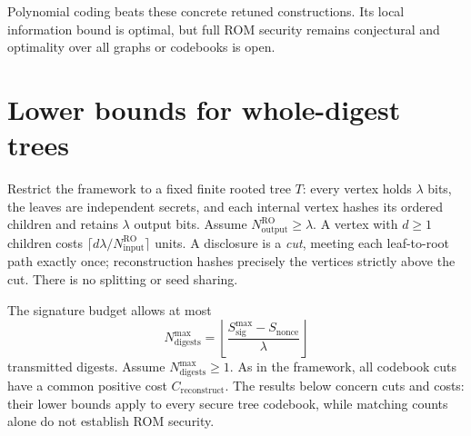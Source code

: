\documentclass[10pt]{article}
\newcommand{\roinput}{N_{\mathrm{input}}^{\mathrm{RO}}}
\newcommand{\rooutput}{N_{\mathrm{output}}^{\mathrm{RO}}}
\newcommand{\sigbudget}{S_{\mathrm{sig}}^{\max}}
\newcommand{\noncesize}{S_{\mathrm{nonce}}}
\newcommand{\digestbudget}{N_{\mathrm{digests}}^{\max}}
\newcommand{\reconstructcost}{C_{\mathrm{reconstruct}}}
\begin{document}
Polynomial coding beats these concrete retuned constructions. Its local information bound is optimal, but full ROM security remains conjectural and optimality over all graphs or codebooks is open.

\clearpage
\section{Lower bounds for whole-digest trees}\label{sec:tree-bounds}
Restrict the framework to a fixed finite rooted tree $T$: every vertex holds $\lambda$ bits, the leaves are independent secrets, and each internal vertex hashes its ordered children and retains $\lambda$ output bits. Assume $\rooutput\ge\lambda$. A vertex with $d\ge1$ children costs $\lceil d\lambda/\roinput\rceil$ units. A disclosure is a \emph{cut}, meeting each leaf-to-root path exactly once; reconstruction hashes precisely the vertices strictly above the cut. There is no splitting or seed sharing.

The signature budget allows at most
\[
 \digestbudget=\left\lfloor\frac{\sigbudget-\noncesize}{\lambda}\right\rfloor
\]
transmitted digests. Assume $\digestbudget\ge1$. As in the framework, all codebook cuts have a common positive cost $\reconstructcost$. The results below concern cuts and costs: their lower bounds apply to every secure tree codebook, while matching counts alone do not establish ROM security.
\end{document}
